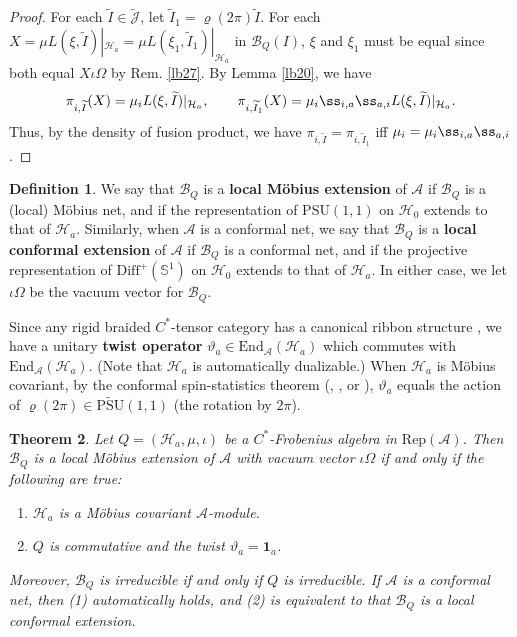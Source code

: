 \documentclass[12pt,a4paper,notitlepage]{article}
\theoremstyle{definition}
\newtheorem{df}{Definition}[section]
\theoremstyle{plain}
\newtheorem{thm}[df]{Theorem}
\newcommand{\mc}{\mathcal}
\newcommand{\wtd}{\widetilde}
\newcommand{\End}{\mathrm{End}} %
\newcommand{\id}{\mathbf{1}}
\newcommand{\Diffp}{\mathrm{Diff}^+}
\newcommand{\PSU}{\mathrm{PSU}(1,1)}
\newcommand{\Jtd}{\widetilde{\mathcal J}}
\newcommand{\RepA}{\mathrm{Rep}(\mathcal A)}
\newcommand{\UPSU}{\widetilde{\mathrm{PSU}}(1,1)}
\newcommand{\Sbb}{{\mathbb S}}
\numberwithin{equation}{section}
\begin{document}
\begin{proof}
For each $\wtd I\in\Jtd$, let $\wtd I_1=\varrho(2\pi)\wtd I$. For each  $X=\mu L(\xi,\wtd I)|_{\mc H_a}=\mu L(\xi_1,\wtd I_1)|_{\mc H_a}$ in $\mc B_Q(I)$,  $\xi$ and $\xi_1$ must be equal since both equal $X\iota\Omega$ by Rem. \ref{lb27}. By Lemma \ref{lb20}, we have
\begin{gather*}
\pi_{i,\wtd I}(X)=\mu_i L(\xi,\wtd I)|_{\mc H_a},\qquad \pi_{i,\wtd I_1}(X)=\mu_i\ss_{i,a}\ss_{a,i}  L(\xi,\wtd I)|_{\mc H_a}.	
\end{gather*}
Thus, by the density of fusion product, we have $\pi_{i,\wtd I}=\pi_{i,\wtd I_1}$ iff $\mu_i=\mu_i\ss_{i,a}\ss_{a,i}$.
\end{proof}


\begin{df}
We say that $\mc B_Q$ is a \textbf{local M\"obius extension} of $\mc A$ if $\mc B_Q$ is a (local) M\"obius net, and if the representation of $\PSU$ on $\mc H_0$ extends to that of $\mc H_a$. Similarly, when $\mc A$ is a conformal net, we say that $\mc B_Q$ is a \textbf{local conformal extension} of $\mc A$ if $\mc B_Q$ is a conformal net, and if the projective representation of $\Diffp(\Sbb^1)$ on $\mc H_0$ extends to that of $\mc H_a$. In either case, we let $\iota\Omega$ be the vacuum vector for $\mc B_Q$.
\end{df}


Since any rigid braided $C^*$-tensor category has a canonical ribbon structure \cite{Mug00}, we have a unitary \textbf{twist operator} $\vartheta_a\in\End_{\mc A}(\mc H_a)$ which commutes with $\End_{\mc A}(\mc H_a)$. (Note that $\mc H_a$ is automatically dualizable.) When $\mc H_a$ is M\"obius covariant, by the conformal spin-statistics theorem (\cite[Thm. 3.13]{GL96}, \cite[Sec. 4.1]{Jor96}, or \cite[Thm. 6.8]{Gui21b}), $\vartheta_a$ equals the action of $\varrho(2\pi)\in\UPSU$ (the rotation by $2\pi$).







\begin{thm}\label{lb25}
Let $Q=(\mc H_a,\mu,\iota)$ be a $C^*$-Frobenius algebra in $\RepA$. Then $\mc B_Q$ is a local M\"obius extension of $\mc A$ with vacuum vector $\iota\Omega$ if and only if the following are true:
\begin{enumerate}[label=(\arabic*)]
\item $\mc H_a$ is a M\"obius covariant $\mc A$-module.
\item $Q$ is commutative and the twist $\vartheta_a=\id_a$.
\end{enumerate}
Moreover, $\mc B_Q$ is irreducible if and only if $Q$ is irreducible. If $\mc A$ is a conformal net, then (1) automatically holds, and (2) is equivalent to that $\mc B_Q$ is a local conformal extension.
\end{thm}
\end{document}
